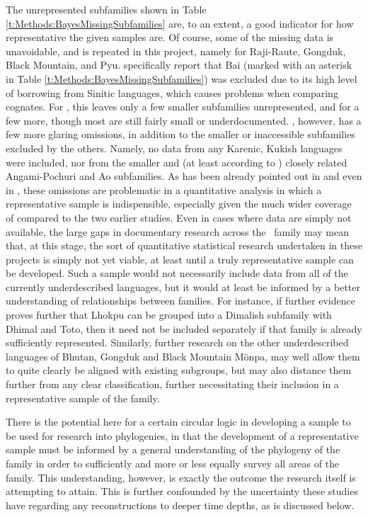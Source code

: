 The unrepresented subfamilies shown in Table \ref{t:Methods:BayesMissingSubfamilies} are, to an extent, a good indicator for how representative the given samples are. Of course, some of the missing data is unavoidable, and is repeated in this project, namely for Raji-Raute, Gongduk, Black Mountain, and Pyu.  specifically report that Bai (marked with an asterisk in Table \ref{t:Methods:BayesMissingSubfamilies}) was excluded due to its high level of borrowing from Sinitic languages, which causes problems when comparing cognates. For , this leaves only a few smaller subfamilies unrepresented, and for  a few more, though most are still fairly small or underdocumented. , however, has a few more glaring omissions, in addition to the smaller or inaccessible subfamilies excluded by the others. Namely, no data from any Karenic, Kukish languages were included, nor from the smaller and (at least according to ) closely related Angami-Pochuri and Ao subfamilies. As has been already pointed out in  and even in , these omissions are problematic in a quantitative analysis in which a representative sample is indispensible, especially given the much wider coverage of  compared to the two earlier studies. Even in cases where data are simply not available, the large gaps in documentary research across the \lfam\ family may mean that, at this stage, the sort of quantitative statistical research undertaken in these projects is simply not yet viable, at least until a truly representative sample can be developed. Such a sample would not necessarily include data from all of the currently underdescribed languages, but it would at least be informed by a better understanding of relationships between families. For instance, if further evidence proves further that Lhokpu can be grouped into a Dimalish subfamily with Dhimal and Toto, then it need not be included separately if that family is already sufficiently represented. Similarly, further research on the other underdescribed languages of Bhutan, Gongduk and Black Mountain Mönpa, may well allow them to quite clearly be aligned with existing subgroups, but may also distance them further from any clear classification, further necessitating their inclusion in a representative sample of the family.

There is the potential here for a certain circular logic in developing a sample to be used for research into phylogenies, in that the development of a representative sample must be informed by a general understanding of the phylogeny of the family in order to sufficiently and more or less equally survey all areas of the family. This understanding, however, is exactly the outcome the research itself is attempting to attain. This is further confounded by the uncertainty these studies have regarding any reconstructions to deeper time depths, as is discussed below.

